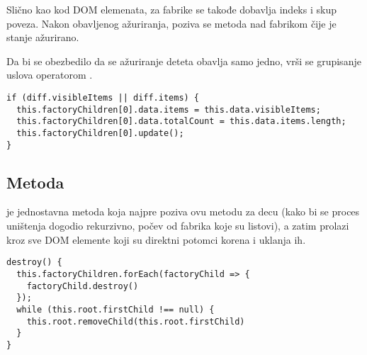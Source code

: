 Slično kao kod DOM elemenata, za fabrike se takođe dobavlja indeks i skup poveza.
Nakon obavljenog ažuriranja, poziva se metoda  nad fabrikom čije je stanje ažurirano.

Da bi se obezbedilo da se ažuriranje deteta obavlja samo jedno, vrši se grupisanje uslova operatorom \code{||}.

\begin{lstlisting}
if (diff.visibleItems || diff.items) {
  this.factoryChildren[0].data.items = this.data.visibleItems;
  this.factoryChildren[0].data.totalCount = this.data.items.length;
  this.factoryChildren[0].update();
}
\end{lstlisting}

\subsection{Metoda }
\label{subsec:metoda-destroy}

 je jednostavna metoda koja najpre poziva ovu metodu za decu (kako bi se proces uništenja dogodio rekurzivno, počev od fabrika koje su listovi), a zatim prolazi kroz sve DOM elemente koji su direktni potomci korena i uklanja ih.

\begin{lstlisting}
destroy() {
  this.factoryChildren.forEach(factoryChild => {
    factoryChild.destroy()
  });
  while (this.root.firstChild !== null) {
    this.root.removeChild(this.root.firstChild)
  }
}
\end{lstlisting}
